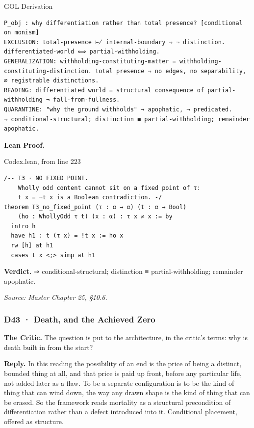 \documentclass[10pt,twocolumn]{article}
\begin{document}
\begin{golbox}{GOL Derivation}
\begin{lstlisting}[style=golv]
P_obj : why differentiation rather than total presence? [conditional on monism]
EXCLUSION: total-presence ⊬ internal-boundary ⇒ ¬ distinction. differentiated-world ⟺ partial-withholding.
GENERALIZATION: withholding-constituting-matter = withholding-constituting-distinction. total presence ⇒ no edges, no separability, ∅ registrable distinctions.
READING: differentiated world = structural consequence of partial-withholding ¬ fall-from-fullness.
QUARANTINE: "why the ground withholds" → apophatic, ¬ predicated.
⇒ conditional-structural; distinction ≡ partial-withholding; remainder apophatic.
\end{lstlisting}
\end{golbox}

\textbf{Lean Proof.}

\begin{leanexcerpt}{Codex.lean, from line 223}
\begin{lstlisting}[style=leanx,firstnumber=223]
/-- T3 · NO FIXED POINT.
    Wholly odd content cannot sit on a fixed point of τ:
    t x = ¬t x is a Boolean contradiction. -/
theorem T3_no_fixed_point (τ : α → α) (t : α → Bool)
    (ho : WhollyOdd τ t) (x : α) : τ x ≠ x := by
  intro h
  have h1 : t (τ x) = !t x := ho x
  rw [h] at h1
  cases t x <;> simp at h1
\end{lstlisting}
\end{leanexcerpt}

\textbf{Verdict.} ⇒ conditional-structural; distinction ≡
partial-withholding; remainder apophatic.

\emph{Source: Master Chapter 25, §10.6.}

\hypertarget{d43-death-and-the-achieved-zero}{%
\subsubsection{D43 · Death, and the Achieved
Zero}\label{d43-death-and-the-achieved-zero}}

\textbf{The Critic.} The question is put to the architecture, in the
critic's terms: why is death built in from the start?

\textbf{Reply.} In this reading the possibility of an end is the price
of being a distinct, bounded thing at all, and that price is paid up
front, before any particular life, not added later as a flaw. To be a
separate configuration is to be the kind of thing that can wind down,
the way any drawn shape is the kind of thing that can be erased. So the
framework reads mortality as a structural precondition of
differentiation rather than a defect introduced into it. Conditional
placement, offered as structure.
\end{document}
